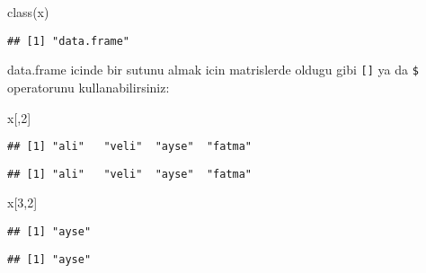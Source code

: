 \documentclass[
]{book}
\newenvironment{Shaded}{\begin{snugshade}}{\end{snugshade}}
\newcommand{\DecValTok}[1]{\textcolor[rgb]{0.00,0.00,0.81}{#1}}
\newcommand{\FunctionTok}[1]{\textcolor[rgb]{0.00,0.00,0.00}{#1}}
\newcommand{\NormalTok}[1]{#1}
\newcommand{\SpecialCharTok}[1]{\textcolor[rgb]{0.00,0.00,0.00}{#1}}
\begin{document}
\begin{Shaded}
\begin{Highlighting}[]
\FunctionTok{class}\NormalTok{(x)}
\end{Highlighting}
\end{Shaded}

\begin{verbatim}
## [1] "data.frame"
\end{verbatim}

data.frame icinde bir sutunu almak icin matrislerde oldugu gibi \texttt{{[}{]}} ya da \texttt{\$} operatorunu kullanabilirsiniz:

\begin{Shaded}
\begin{Highlighting}[]
\NormalTok{x[,}\DecValTok{2}\NormalTok{]}
\end{Highlighting}
\end{Shaded}

\begin{verbatim}
## [1] "ali"   "veli"  "ayse"  "fatma"
\end{verbatim}

\begin{Shaded}
\end{Shaded}

\begin{verbatim}
## [1] "ali"   "veli"  "ayse"  "fatma"
\end{verbatim}

\begin{Shaded}
\begin{Highlighting}[]
\NormalTok{x[}\DecValTok{3}\NormalTok{,}\DecValTok{2}\NormalTok{]}
\end{Highlighting}
\end{Shaded}

\begin{verbatim}
## [1] "ayse"
\end{verbatim}

\begin{Shaded}
\end{Shaded}

\begin{verbatim}
## [1] "ayse"
\end{verbatim}
\end{document}
